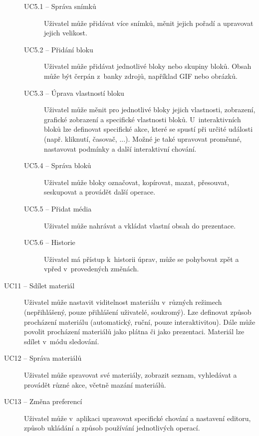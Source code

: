 \begin{description}
        \begin{description}
            \item[UC5.1 -- Správa snímků]
            Uživatel může přidávat více snímků, měnit jejich pořadí a upravovat jejich velikost.
            
            \item[UC5.2 -- Přidání bloku]
            Uživatel může přidávat jednotlivé bloky nebo skupiny bloků. Obsah může být čerpán z~banky zdrojů, například GIF nebo obrázků.
            
            \item[UC5.3 -- Úprava vlastností bloku]
            Uživatel může měnit pro jednotlivé bloky jejich vlastnosti, zobrazení, grafické zobrazení a specifické vlastnosti bloků. U~interaktivních bloků lze definovat specifické akce, které se spustí při určité události (např. kliknutí, časovač, ...). Možné je také upravovat proměnné, nastavovat podmínky a další interaktivní chování.
            
            \item[UC5.4 -- Správa bloků]
            Uživatel může bloky označovat, kopírovat, mazat, přesouvat, seskupovat a provádět další operace.
            
            \item[UC5.5 -- Přidat média]
            Uživatel může nahrávat a vkládat vlastní obsah do prezentace.
            
            \item[UC5.6 -- Historie]
            Uživatel má přístup k~historii úprav, může se pohybovat zpět a vpřed v~provedených změnách.
        \end{description}
    
    \item[UC11 -- Sdílet materiál]
    Uživatel může nastavit viditelnost materiálu v~různých režimech (nepřihlášený, pouze přihlášení uživatelé, soukromý). Lze definovat způsob procházení materiálu (automatický, ruční, pouze interaktivitou). Dále může povolit procházení materiálů jako plátna či jako prezentaci. Materiál lze sdílet v~módu sledování.
    
    \item[UC12 -- Správa materiálů]
    Uživatel může spravovat své materiály, zobrazit seznam, vyhledávat a provádět různé akce, včetně mazání materiálů.
    
    \item[UC13 -- Změna preferencí]
    Uživatel může v~aplikaci upravovat specifické chování a nastavení editoru, způsob ukládání a způsob používání jednotlivých operací.


\end{description}

